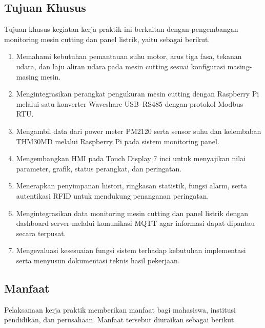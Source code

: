 \subsection{Tujuan Khusus}

Tujuan khusus kegiatan kerja praktik ini berkaitan dengan pengembangan monitoring mesin cutting dan panel listrik, yaitu sebagai berikut.

\begin{enumerate}[leftmargin=*,itemsep=2pt]
\item Memahami kebutuhan pemantauan suhu motor, arus tiga fasa, tekanan udara, dan laju aliran udara pada mesin cutting sesuai konfigurasi masing-masing mesin.

\item Mengintegrasikan perangkat pengukuran mesin cutting dengan Raspberry Pi melalui satu konverter Waveshare USB--RS485 dengan protokol Modbus RTU.

\item Mengambil data dari power meter PM2120 serta sensor suhu dan kelembaban THM30MD melalui Raspberry Pi pada sistem monitoring panel.

\item Mengembangkan HMI pada Touch Display 7 inci untuk menyajikan nilai parameter, grafik, status perangkat, dan peringatan.

\item Menerapkan penyimpanan histori, ringkasan statistik, fungsi alarm, serta autentikasi RFID untuk mendukung penanganan peringatan.

\item Mengintegrasikan data monitoring mesin cutting dan panel listrik dengan dashboard server melalui komunikasi MQTT agar informasi dapat dipantau secara terpusat.

\item Mengevaluasi kesesuaian fungsi sistem terhadap kebutuhan implementasi serta menyusun dokumentasi teknis hasil pekerjaan.

\end{enumerate}

\subsection{Manfaat}

Pelaksanaan kerja praktik memberikan manfaat bagi mahasiswa, institusi pendidikan, dan perusahaan. Manfaat tersebut diuraikan sebagai berikut.

